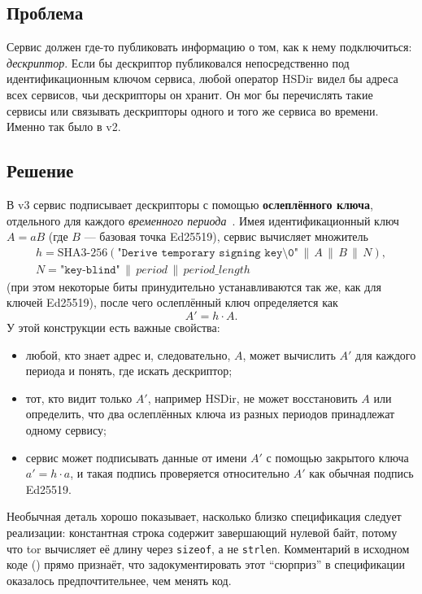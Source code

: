 \subsection{Проблема}

Сервис должен где-то публиковать информацию о том, как к нему подключиться: \emph{дескриптор}. Если бы дескриптор публиковался непосредственно под идентификационным ключом сервиса, любой оператор HSDir видел бы адреса всех сервисов, чьи дескрипторы он хранит. Он мог бы перечислять такие сервисы или связывать дескрипторы одного и того же сервиса во времени. Именно так было в v2.

\subsection{Решение}

В v3 сервис подписывает дескрипторы с помощью \textbf{ослеплённого ключа}, отдельного для каждого \emph{временного периода}~. Имея идентификационный ключ $A = aB$ (где $B$ — базовая точка Ed25519), сервис вычисляет множитель
\begin{gather*}
h = \mathrm{SHA3\text{-}256}(\texttt{"Derive temporary signing key\textbackslash 0"} \,\|\, A \,\|\, B \,\|\, N), \\
N = \texttt{"key-blind"} \,\|\, \mathit{period} \,\|\, \mathit{period\_length}
\end{gather*}
(при этом некоторые биты принудительно устанавливаются так же, как для ключей Ed25519), после чего ослеплённый ключ определяется как
\[
A' = h \cdot A.
\]
У этой конструкции есть важные свойства:
\begin{itemize}
  \item любой, кто знает адрес и, следовательно, $A$, может вычислить $A'$ для каждого периода и понять, где искать дескриптор;
  \item тот, кто видит только $A'$, например HSDir, не может восстановить $A$ или определить, что два ослеплённых ключа из разных периодов принадлежат одному сервису;
  \item сервис может подписывать данные от имени $A'$ с помощью закрытого ключа $a' = h \cdot a$, и такая подпись проверяется относительно $A'$ как обычная подпись Ed25519.
\end{itemize}

Необычная деталь хорошо показывает, насколько близко спецификация следует реализации: константная строка содержит завершающий нулевой байт, потому что tor вычисляет её длину через \texttt{sizeof}, а не \texttt{strlen}. Комментарий в исходном коде () прямо признаёт, что задокументировать этот \enquote{сюрприз} в спецификации оказалось предпочтительнее, чем менять код.


